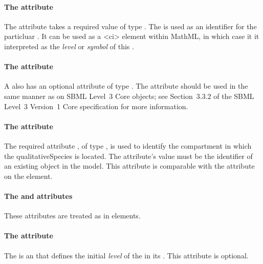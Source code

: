\paragraph{The \fixttspace{} attribute}

The  attribute takes a required value
of type . The  is used as an identifier for the particluar \QualitativeSpecies. It can be used as a 
<ci> element within MathML, in which case it it interpreted as the \emph{level} or \emph{symbol} of this \QualitativeSpecies.

\paragraph{The \fixttspace{} attribute}

A \QualitativeSpecies also has an optional  attribute of type . 
 The  attribute should be used
in the same manner as on SBML Level~3 Core
objects; see Section~3.3.2 of the SBML Level~3 Version~1 Core
specification for more information.


\paragraph{The  attribute}
The required attribute , of type , is used to identify the compartment in which the qualitativeSpecies is located.  The attribute's value must be the identifier of an existing  object in the model.  This attribute is comparable with the  attribute on the  element.

\paragraph{The  and  attributes}
These attributes are treated as in  elements. 




\paragraph{The   attribute}
The  is an  that defines the initial \emph{level} of the \QualitativeSpecies in its . This attribute is optional.

